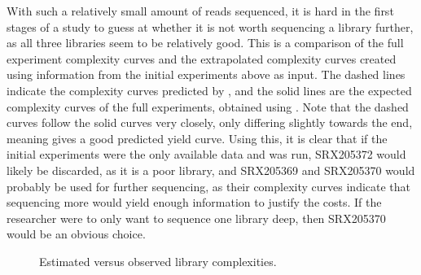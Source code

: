 \documentclass[11pt, titlepage]{article}
\begin{document}
With such a relatively small amount of reads sequenced, it is hard in the first stages of a study to guess at whether it is not worth sequencing a library further, as all three libraries seem to be relatively good. 
\newpage
This is a comparison of the full experiment complexity curves and the extrapolated complexity curves created using information from the initial experiments above as input. The dashed lines indicate the complexity curves predicted by , and the solid lines are the expected complexity curves of the full experiments, obtained using . Note that the dashed curves follow the solid curves very closely, only differing slightly towards the end, meaning  gives a good predicted yield curve.  Using this, it is clear that if the initial experiments were the only available data and  was run, SRX205372 would likely be discarded, as it is a poor library, and SRX205369 and SRX205370 would probably be used for further sequencing, as their complexity curves indicate that sequencing more would yield enough information to justify the costs.  If the researcher were to only want to sequence one library deep, then SRX205370 would be an obvious choice. 
\newline
\newline
\begin{figure}[h!]
\centering
{}
\caption{Estimated versus observed library complexities.}
\end{figure}
\end{document}
